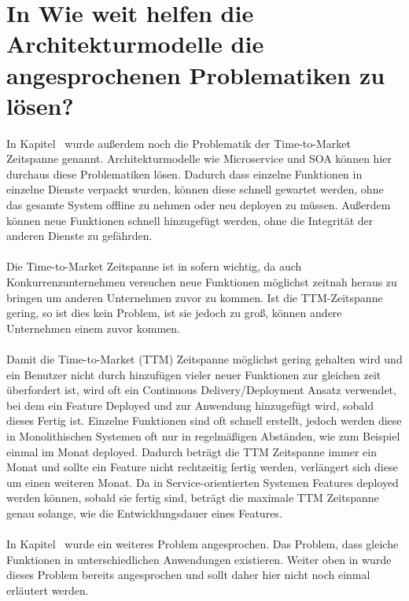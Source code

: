 \section{In Wie weit helfen die Architekturmodelle die angesprochenen Problematiken zu lösen?}
\label{sec:LoesungDerProblematiken}
In Kapitel \ wurde außerdem noch die Problematik der Time-to-Market Zeitspanne genannt. Architekturmodelle wie Microservice und SOA können hier durchaus diese Problematiken lösen. Dadurch dass einzelne Funktionen in einzelne Dienste verpackt wurden, können diese schnell gewartet werden, ohne das gesamte System offline zu nehmen oder neu deployen zu müssen. Außerdem können neue Funktionen schnell hinzugefügt werden, ohne die Integrität der anderen Dienste zu gefährden.
\\\\
Die Time-to-Market Zeitspanne ist in sofern wichtig, da auch Konkurrenzunternehmen versuchen neue Funktionen möglichst zeitnah heraus zu bringen um anderen Unternehmen zuvor zu kommen. Ist die TTM-Zeitspanne gering, so ist dies kein Problem, ist sie jedoch zu groß, können andere Unternehmen einem zuvor kommen.
\\\\
Damit die Time-to-Market (TTM) Zeitspanne möglichst gering gehalten wird und ein Benutzer nicht durch hinzufügen vieler neuer Funktionen zur gleichen zeit überfordert ist, wird oft ein Continuous Delivery/Deployment Ansatz verwendet, bei dem ein Feature Deployed und zur Anwendung hinzugefügt wird, sobald dieses Fertig ist. Einzelne Funktionen sind oft schnell erstellt, jedoch werden diese in Monolithischen Systemen oft nur in regelmäßigen Abständen, wie zum Beispiel einmal im Monat deployed. Dadurch beträgt die TTM Zeitspanne immer ein Monat und sollte ein Feature nicht rechtzeitig fertig werden, verlängert sich diese um einen weiteren Monat. Da in Service-orientierten Systemen Features deployed werden können, sobald sie fertig sind, beträgt die maximale TTM Zeitspanne genau solange, wie die Entwicklungsdauer eines Features.
\\\\
In Kapitel \ wurde ein weiteres Problem angesprochen. Das Problem, dass gleiche Funktionen in unterschiedlichen Anwendungen existieren. Weiter oben in  wurde dieses Problem bereits angesprochen und sollt daher hier nicht noch einmal erläutert werden.

